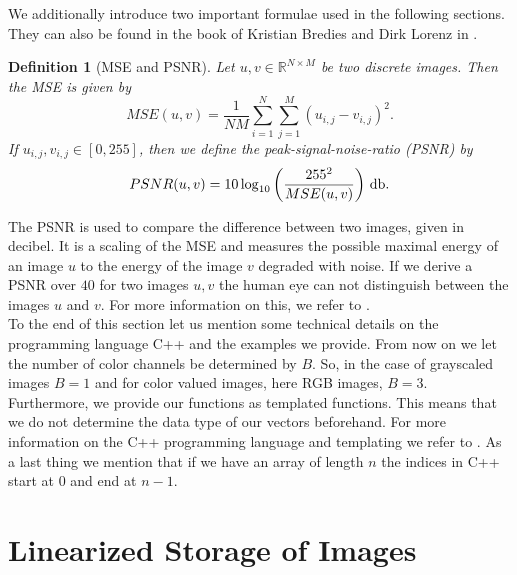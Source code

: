 \documentclass[abstracton]{scrreprt}
\newtheorem{definition}[theorem]{Definition}
\begin{document}
        We additionally introduce two important formulae used in the following sections. They can also be found in the book of Kristian Bredies and Dirk Lorenz in \cite{Bredies}.
        \begin{definition}[MSE and PSNR]
            Let $u, v \in \mathbb{R}^{N \times M}$ be two discrete images. Then the MSE is given by
                \begin{equation}
                    MSE(u,v) = \frac{1}{NM} \sum_{i = 1}^{N} \sum_{j = 1}^{M} (u_{i,j} - v_{i,j})^{2}.
                    \label{eq:mse}
                \end{equation}
            If $u_{i,j}, v_{i,j} \in [0, 255]$, then we define the peak-signal-noise-ratio (PSNR) by
                \begin{equation}
                    PSNR(u, v) = 10 \log_{10} \left( \frac{255^{2}}{MSE(u,v)} \right)\, \textnormal{db}.
                    \label{eq:psnr}
                \end{equation}
        \end{definition}
        The PSNR is used to compare the difference between two images, given in decibel. It is a scaling of the MSE and measures the possible maximal energy of an image $u$ to the energy of the image $v$ degraded with noise. If we derive a PSNR over $40$ for two images $u,v$ the human eye can not distinguish between the images $u$ and $v$. For more information on this, we refer to \cite{Bredies}.\\
        To the end of this section let us mention some technical details on the programming language C++ and the examples we provide. From now on we let the number of color channels be determined by $B$. So, in the case of grayscaled images $B = 1$ and for color valued images, here RGB images, $B = 3$. Furthermore, we provide our functions as templated functions. This means that we do not determine the data type of our vectors beforehand. For more information on the C++ programming language and templating we refer to \cite{CPlusPlus}. As a last thing we mention that if we have an array of length $n$ the indices in C++ start at $0$ and end at $n-1$.

    \section{Linearized Storage of Images} %
    \label{sec:linearized_storage_of_images}
        
\end{document}
